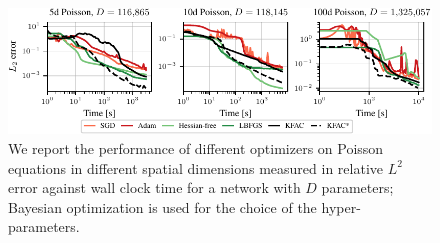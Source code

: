 \begin{figure}
    \centering
    \includegraphics{../kfac_pinns_exp/exp33_poisson_bayes_groupplot/l2_error_over_time.pdf}
    \caption{
    We report the performance of different optimizers on Poisson equations in different spatial dimensions measured in relative $L^2$ error against wall clock time for a network with $D$ parameters; Bayesian optimization is used for the choice of the hyper-parameters.
    }
    \label{fig:10D-Poisson}
\end{figure}


